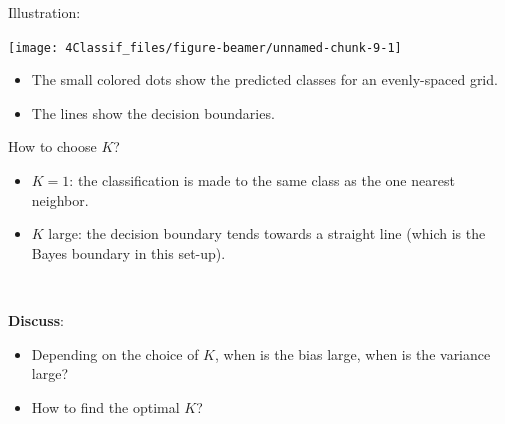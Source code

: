 \documentclass[
  10pt,
  ignorenonframetext,
]{beamer}
\providecommand{\tightlist}{%
  \setlength{\itemsep}{0pt}\setlength{\parskip}{0pt}}
\begin{document}
\begin{frame}
Illustration:

\begin{center}\texttt{[image: 4Classif\_files/figure-beamer/unnamed-chunk-9-1]} \end{center}

\vspace{2mm}

\scriptsize

\begin{itemize}
\tightlist
\item
  The small colored dots show the predicted classes for an evenly-spaced
  grid.
\item
  The lines show the decision boundaries.
\end{itemize}
\end{frame}

\begin{frame}
\begin{block}{How to choose \(K\)?}
\protect\hypertarget{how-to-choose-k}{}
\vspace{2mm}

\begin{itemize}
\tightlist
\item
  \(K=1\): the classification is made to the same class as the one
  nearest neighbor.
\end{itemize}

\vspace{2mm}

\begin{itemize}
\tightlist
\item
  \(K\) large: the decision boundary tends towards a straight line
  (which is the Bayes boundary in this set-up).
\end{itemize}

\vspace{2mm}

\(~\)

\textbf{Discuss}:

\vspace{2mm}

\begin{itemize}
\tightlist
\item
  Depending on the choice of \(K\), when is the bias large, when is the
  variance large?
\end{itemize}

\vspace{2mm}

\begin{itemize}
\tightlist
\item
  How to find the optimal \(K\)?
\end{itemize}
\end{block}
\end{frame}
\end{document}
